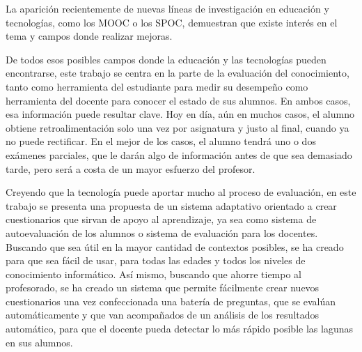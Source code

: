 La aparición recientemente de nuevas líneas de investigación en educación y tecnologías, como los \acrshort{MOOC} o los \acrshort{SPOC}, demuestran que existe interés en el tema y campos donde realizar mejoras.

De todos esos posibles campos donde la educación y las tecnologías pueden encontrarse, este trabajo se centra en la parte de la evaluación del conocimiento, tanto como herramienta del estudiante para medir su desempeño como herramienta del docente para conocer el estado de sus alumnos. En ambos casos, esa información puede resultar clave. Hoy en día, aún en muchos casos, el alumno obtiene retroalimentación solo una vez por asignatura y justo al final, cuando ya no puede rectificar. En el mejor de los casos, el alumno tendrá uno o dos exámenes parciales, que le darán algo de información antes de que sea demasiado tarde, pero será a costa de un mayor esfuerzo del profesor.

Creyendo que la tecnología puede aportar mucho al proceso de evaluación, en este trabajo se presenta una propuesta de un sistema adaptativo orientado a crear cuestionarios que sirvan de apoyo al aprendizaje, ya sea como sistema de autoevaluación de los alumnos o sistema de evaluación para los docentes. 
Buscando que sea útil en la mayor cantidad de contextos posibles, se ha creado para que sea fácil de usar, para todas las edades y todos los niveles de conocimiento informático. Así mismo, buscando que ahorre tiempo al profesorado, se ha creado un sistema que permite fácilmente crear nuevos cuestionarios una vez confeccionada una batería de preguntas, que se evalúan automáticamente y que van acompañados de un análisis de los resultados automático, para que el docente pueda detectar lo más rápido posible las lagunas en sus alumnos.




